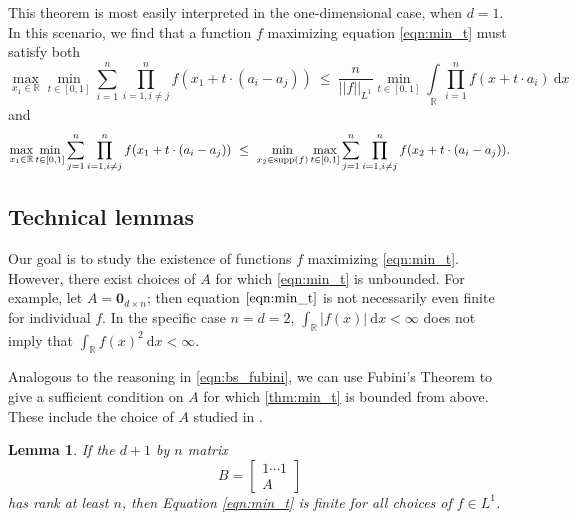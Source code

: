 \documentclass[11pt,reqno]{amsart}
\numberwithin{equation}{section}
\theoremstyle{plain}
\newtheorem{lemma}[thm]{Lemma}
\newcommand{\R}{\ensuremath{\mathbb{R}}}
\begin{document}
This theorem is most easily interpreted in the one-dimensional case, when $d=1$. In this scenario, we find that a function $f$ maximizing equation \eqref{eqn:min_t} must satisfy both
\begin{equation}
    \max\limits_{x_1 \in \R}\min\limits_{t\in[0,1]}\sum\limits_{i=1}^{n}\prod\limits_{i=1,i\neq j}^{n}f(x_1+t\cdot (a_i-a_j))\ \le \ \frac{n}{||f||_{L^1}}\min\limits_{t\in[0,1]}\int\limits_{\R}\prod\limits_{i=1}^{n}f(x+t\cdot a_i)\ \mathrm{d}x
\end{equation}
and
\begin{equation}
    \max\limits_{x_1 \in \R}\min\limits_{t\in[0,1]}\sum\limits_{j=1}^n \prod\limits_{i=1,i\neq j}^{n}f(x_1+t\cdot (a_i-a_j))\ \le \ \min\limits_{x_2 \in {\rm supp}(f)}\max\limits_{t\in[0,1]}\sum\limits_{j=1}^n \prod\limits_{i=1,i\neq j}^{n}f(x_2+t\cdot (a_i-a_j)).
\end{equation}


\subsection{Technical lemmas}\label{subsection:lemma}
Our goal is to study the existence of functions $f$ maximizing \eqref{eqn:min_t}. However, there exist choices of $A$ for which \eqref{eqn:min_t} is unbounded. For example, let $A=\mathbf{0}_{d \times n}$; then equation $\eqref{eqn:min_t}$ is not necessarily even finite for individual $f$. In the specific case $n=d=2$, $\int_\R |f(x)|\ \mathrm{d}x < \infty$ does not imply that $\int_\R f(x)^2\ \mathrm{d}x < \infty$.

Analogous to the reasoning in \eqref{eqn:bs_fubini}, we can use Fubini's Theorem to give a sufficient condition on $A$ for which \eqref{thm:min_t} is bounded from above. These include the choice of $A$ studied in \cite{BS}.

\begin{lemma}\label{lemma:A_condition}
If the $d+1$ by $n$ matrix
\begin{equation*}
    B=\left[\begin{array}{c}
    1 \cdots 1  \\ \hline A
    \end{array}\right]
\end{equation*}
has rank at least $n$, then Equation \eqref{eqn:min_t} is finite for all choices of $f \in L^1$.
\end{lemma}
\end{document}
